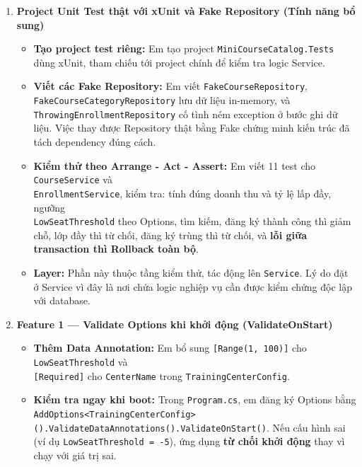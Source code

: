 \begin{enumerate}[label = \textbf{\arabic*.}, leftmargin = 0.5cm]
    \item \textbf{Project Unit Test thật với xUnit và Fake Repository (Tính năng bổ sung)}
        \begin{itemize}[label = $\bullet$, leftmargin = 0.3cm]
            \item \textbf{Tạo project test riêng:} Em tạo project \texttt{MiniCourseCatalog.Tests} dùng xUnit, tham chiếu tới project chính để kiểm tra logic Service.

            \item \textbf{Viết các Fake Repository:} Em viết \texttt{FakeCourseRepository}, \\ \texttt{FakeCourseCategoryRepository} lưu dữ liệu in-memory, và \\ \texttt{ThrowingEnrollmentRepository} cố tình ném exception ở bước ghi dữ liệu. Việc thay được Repository thật bằng Fake chứng minh kiến trúc đã tách dependency đúng cách.

            \item \textbf{Kiểm thử theo Arrange - Act - Assert:} Em viết 11 test cho \texttt{CourseService} và \\ \texttt{EnrollmentService}, kiểm tra: tính đúng doanh thu và tỷ lệ lấp đầy, ngưỡng \\ \texttt{LowSeatThreshold} theo Options, tìm kiếm, đăng ký thành công thì giảm chỗ, lớp đầy thì từ chối, đăng ký trùng thì từ chối, và \textbf{lỗi giữa transaction thì Rollback toàn bộ}.

            \item \textbf{Layer:} Phần này thuộc tầng kiểm thử, tác động lên \texttt{Service}. Lý do đặt ở Service vì đây là nơi chứa logic nghiệp vụ cần được kiểm chứng độc lập với database.
        \end{itemize}

    \item \textbf{Feature 1 --- Validate Options khi khởi động (ValidateOnStart)}
        \begin{itemize}[label = $\bullet$, leftmargin = 0.3cm]
            \item \textbf{Thêm Data Annotation:} Em bổ sung \texttt{[Range(1, 100)]} cho \texttt{LowSeatThreshold} và \\ \texttt{[Required]} cho \texttt{CenterName} trong \texttt{TrainingCenterConfig}.

            \item \textbf{Kiểm tra ngay khi boot:} Trong \texttt{Program.cs}, em đăng ký Options bằng \\ \texttt{AddOptions<TrainingCenterConfig>().ValidateDataAnnotations().ValidateOnStart()}. Nếu cấu hình sai (ví dụ \texttt{LowSeatThreshold = -5}), ứng dụng \textbf{từ chối khởi động} thay vì chạy với giá trị sai.


\end{itemize}
\end{enumerate}
